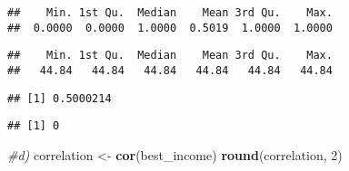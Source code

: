 \documentclass[]{article}
\newenvironment{Shaded}{\begin{snugshade}}{\end{snugshade}}
\newcommand{\KeywordTok}[1]{\textcolor[rgb]{0.13,0.29,0.53}{\textbf{{#1}}}}
\newcommand{\DecValTok}[1]{\textcolor[rgb]{0.00,0.00,0.81}{{#1}}}
\newcommand{\StringTok}[1]{\textcolor[rgb]{0.31,0.60,0.02}{{#1}}}
\newcommand{\CommentTok}[1]{\textcolor[rgb]{0.56,0.35,0.01}{\textit{{#1}}}}
\newcommand{\NormalTok}[1]{{#1}}
\begin{document}
\begin{Shaded}
\end{Shaded}

\begin{verbatim}
##    Min. 1st Qu.  Median    Mean 3rd Qu.    Max. 
##  0.0000  0.0000  1.0000  0.5019  1.0000  1.0000
\end{verbatim}

\begin{Shaded}
\end{Shaded}

\begin{verbatim}
##    Min. 1st Qu.  Median    Mean 3rd Qu.    Max. 
##   44.84   44.84   44.84   44.84   44.84   44.84
\end{verbatim}

\begin{Shaded}
\end{Shaded}

\begin{verbatim}
## [1] 0.5000214
\end{verbatim}

\begin{Shaded}
\end{Shaded}

\begin{verbatim}
## [1] 0
\end{verbatim}

\begin{Shaded}
\begin{Highlighting}[]
\CommentTok{#d)}
\NormalTok{correlation <-}\StringTok{ }\KeywordTok{cor}\NormalTok{(best_income)}
\KeywordTok{round}\NormalTok{(correlation, }\DecValTok{2}\NormalTok{)}
\end{Highlighting}
\end{Shaded}
\end{document}

